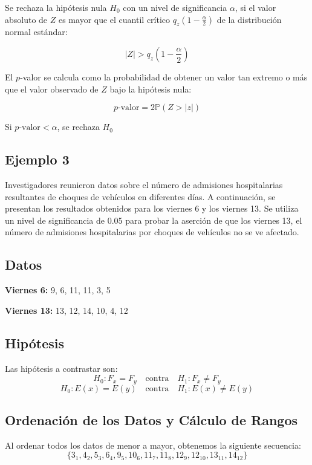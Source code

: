 \documentclass{article}
\begin{document}
Se rechaza la hipótesis nula $H_0$ con un nivel de significancia $\alpha$, si el valor absoluto de $Z$ es mayor que el cuantil crítico $q_z(1-\frac{\alpha}{2})$ de la distribución normal estándar:

\[
    |Z| > q_z\left(1-\frac{\alpha}{2}\right)
\]

El $p$-valor se calcula como la probabilidad de obtener un valor tan extremo o más que el valor observado de $Z$ bajo la hipótesis nula:

\[
    p\text{-valor} = 2\mathbb{P}(Z > |z|)
\]

Si $p\text{-valor} < \alpha$, se rechaza $H_0$

\subsection*{Ejemplo 3}

Investigadores reunieron datos sobre el número de admisiones hospitalarias resultantes de choques de vehículos en diferentes días. A continuación, se presentan los resultados obtenidos para los viernes 6 y los viernes 13. Se utiliza un nivel de significancia de 0.05 para probar la aserción de que los viernes 13, el número de admisiones hospitalarias por choques de vehículos no se ve afectado.

\subsection*{Datos}

\textbf{Viernes 6:} 9, 6, 11, 11, 3, 5

\textbf{Viernes 13:} 13, 12, 14, 10, 4, 12

\subsection*{Hipótesis}

Las hipótesis a contrastar son:
\[
    H_0: F_x = F_y \quad \text{contra} \quad H_1: F_x \neq F_y
\]
\[
    H_0: E(x) = E(y) \quad \text{contra} \quad H_1: E(x) \neq E(y)
\]

\subsection*{Ordenación de los Datos y Cálculo de Rangos}

Al ordenar todos los datos de menor a mayor, obtenemos la siguiente secuencia:
\[
    \{3_1, 4_2, 5_3, 6_4, 9_5, 10_6, 11_7, 11_8, 12_9, 12_{10}, 13_{11}, 14_{12}\}
\]
\end{document}
